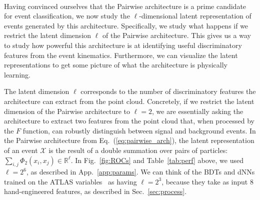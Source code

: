 \documentclass[aps,prd,twocolumn,superscriptaddress,floatfix,longbibliography,preprintnumbers,nofootinbib]{revtex4-1} %
\DeclareRobustCommand{\Sec}[1]{Sec.~\ref{sec:#1}}
\DeclareRobustCommand{\App}[1]{App.~\ref{app:#1}}
\DeclareRobustCommand{\Tab}[1]{Table~\ref{tab:#1}}
\DeclareRobustCommand{\Fig}[1]{Fig.~\ref{fig:#1}}
\DeclareRobustCommand{\Eq}[1]{Eq.~(\ref{eq:#1})}
\newcounter{para}
\begin{document}
\begin{figure*}[h!]
  \\
  \caption{ 
   Visualization of the latent representations using t-SNE embedding.
   Shown are
   (a) the ATLAS features which effectively have \(\ell=2^3\),
   (b) the Pairwise architecture with \(\ell=2^1\), which has the same information as \Fig{l2_t},
   (c) the Pairwise architecture with \(\ell=2^3\), and
   (d) the Pairwise architecture with \(\ell=2^6\).
   The t-SNE embeddings have been standardized such that the distributions have mean \(0\) and standard deviation \(1\) along both dimensions.
   The standardized embedding is then rotated such that the \(t\overline{t}H\) events are centered on the right side of the figure.
   For each plot, we report the EMD between the distribution of \(t\overline{t}H\) and \(t\overline{t}\) events, which roughly measures the separation of the two distributions, with larger EMD corresponding to better separation.
   We also plot marginalized densities along each axis.}
 \label{fig:latent}
\end{figure*}

Having convinced ourselves that the Pairwise architecture is a prime candidate for event classification, we now study the $\ell$-dimensional latent representation of events generated by this architecture.
%
Specifically, we study what happens if we restrict the latent dimension $\ell$ of the Pairwise architecture.
%
This gives us a way to study how powerful this architecture is at identifying useful discriminatory features from the event kinematics.
%
Furthermore, we can visualize the latent representations to get some picture of what the architecture is physically learning.


The latent dimension $\ell$ corresponds to the number of discriminatory features the architecture can extract from the point cloud.
%
Concretely, if we restrict the latent dimension of the Pairwise architecture to $\ell=2$, we are essentially asking the architecture to extract two features from the point cloud that, when processed by the $F$ function, can robustly distinguish between signal and background events.
%
In the Pairwise architecture from \Eq{pairwise_arch}, the latent representation of an event $\mathcal X$ is the result of a double summation over pairs of particles:  $\sum_{i,j}\Phi_2(x_i,x_j)\in\mathbb R^\ell$.
%
In \Fig{ROCs} and  \Tab{perf} above, we used $\ell=2^6$, as described in \App{params}.
%
We can think of the BDTs and dNNs trained on the ATLAS variables~\cite{ATLAS:2022yrq} as having $\ell=2^3$, because they take as input $8$ hand-engineered features, as described in \Sec{process}. 
\end{document}
